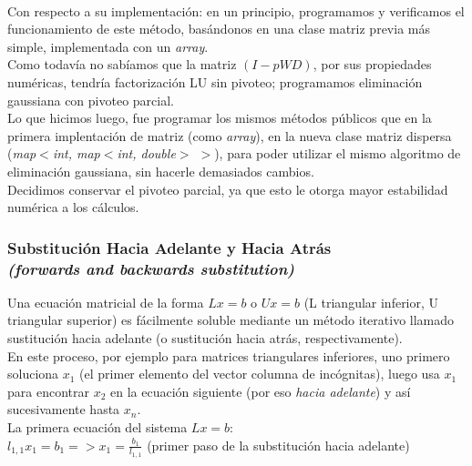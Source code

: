 			\quad \\

				Con respecto a su implementación: en un principio, programamos y verificamos el funcionamiento de este método, basándonos en una clase matriz previa más simple, implementada con un \textit{array}. \\

				Como todavía no sabíamos que la matriz $(I-pWD)$, por sus propiedades numéricas, tendría factorización LU sin pivoteo; programamos eliminación gaussiana con pivoteo parcial. \\ %

				Lo que hicimos luego, fue programar los mismos métodos públicos que en la primera implentación de matriz (como \textit{array}), en la nueva clase matriz dispersa (\textit{map$<$int, map$<$int, double$>$ $>$}), para poder utilizar el mismo algoritmo de eliminación gaussiana, sin hacerle demasiados cambios. \\

				Decidimos conservar el pivoteo parcial, ya que esto le otorga mayor estabilidad numérica a los cálculos. \\ %

		\subsubsection{Substitución Hacia Adelante y Hacia Atrás\\ \textit{(forwards and backwards substitution)}}

			Una ecuación matricial de la forma $Lx = b$ o $Ux = b$ (L triangular inferior, U triangular superior) es fácilmente soluble mediante un método iterativo llamado sustitución hacia adelante (o sustitución hacia atrás, respectivamente). \\

			En este proceso, por ejemplo para matrices triangulares inferiores, uno primero soluciona $x_1$ (el primer elemento del vector columna de incógnitas), luego usa $x_1$ para encontrar $x_2$ en la ecuación siguiente (por eso \textit{hacia adelante}) y así sucesivamente hasta $x_n$. \\

			La primera ecuación del sistema $Lx = b$: \\

			$l_{1,1} x_{1} = b_{1} => x_{1} = \frac{b_{1}}{l_{1,1}}$ \qquad (primer paso de la substitución hacia adelante) \\

